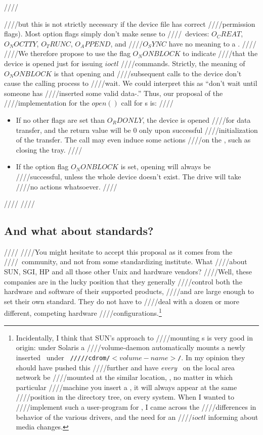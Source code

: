 ////\documentclass{article}
\begin{document}
////but this is not strictly necessary if the device file has correct
////permission flags). Most option flags simply don't make sense to
////\cdrom\ devices: $O_CREAT$, $O_NOCTTY$, $O_TRUNC$, $O_APPEND$, and
////$O_SYNC$ have no meaning to a \cdrom. 
////
////We therefore propose to use the flag $O_NONBLOCK$ to indicate
////that the device is opened just for issuing $ioctl$
////commands. Strictly, the meaning of $O_NONBLOCK$ is that opening and
////subsequent calls to the device don't cause the calling process to
////wait. We could interpret this as ``don't wait until someone has
////inserted some valid data-\cdrom.'' Thus, our proposal of the
////implementation for the $open()$ call for \cdrom s is:
////\begin{itemize}
////\item If no other flags are set than $O_RDONLY$, the device is opened
////for data transfer, and the return value will be 0 only upon successful
////initialization of the transfer. The call may even induce some actions
////on the \cdrom, such as closing the tray.  
////\item If the option flag $O_NONBLOCK$ is set, opening will always be
////successful, unless the whole device doesn't exist. The drive will take
////no actions whatsoever. 
////\end{itemize}
////
////\subsection{And what about standards?}
////
////You might hesitate to accept this proposal as it comes from the
////\linux\ community, and not from some standardizing institute. What
////about SUN, SGI, HP and all those other Unix and hardware vendors?
////Well, these companies are in the lucky position that they generally
////control both the hardware and software of their supported products,
////and are large enough to set their own standard. They do not have to
////deal with a dozen or more different, competing hardware
////configurations.\footnote{Incidentally, I think that SUN's approach to
////mounting \cdrom s is very good in origin: under Solaris a
////volume-daemon automatically mounts a newly inserted \cdrom\ under {\tt
////{/cdrom/$<volume-name>$/}}. In my opinion they should have pushed this
////further and have {\em every\/} \cdrom\ on the local area network be
////mounted at the similar location, \ie, no matter in which particular
////machine you insert a \cdrom, it will always appear at the same
////position in the directory tree, on every system. When I wanted to
////implement such a user-program for \linux, I came across the
////differences in behavior of the various drivers, and the need for an
////$ioctl$ informing about media changes.}
\end{document}
